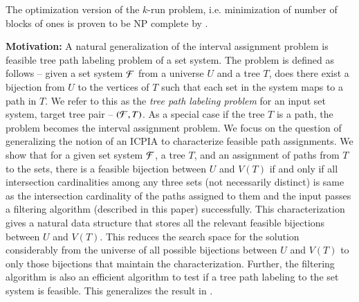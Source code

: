 \documentclass[MS,]{iitmdiss}
\begin{document}
The optimization version of the $k$-run problem, i.e. minimization of
number of blocks of ones is proven to be NP complete by
\cite{k77}. 




{\bf Motivation: } A natural generalization of the interval assignment problem is
feasible tree path labeling problem of a set system. The problem is
defined as follows -- given a set system ${\cal F}$ from a universe $U$ and
a tree $T$, does there exist a bijection from $U$ to the vertices of
$T$ such that each set in the system maps to a path in $T$.  We refer
to this as the {\em tree path labeling problem} for an input set
system, target tree pair -- $({\cal F},T)$. As a special case if the tree
$T$ is a path, the problem becomes the interval assignment problem.
We focus on the question of generalizing the notion of an ICPIA
\cite{nsnrs09} to characterize feasible path assignments.  We show
that for a given set system ${\cal F}$, a tree $T$, and an assignment of
paths from $T$ to the sets, there is a feasible bijection between $U$
and $V(T)$ if and only if all intersection cardinalities among any
three sets (not necessarily distinct) is same as the intersection
cardinality of the paths assigned to them and the input passes a
filtering algorithm (described in this paper) successfully.  This
characterization gives a natural data structure that stores all the
relevant feasible bijections between $U$ and $V(T)$. This reduces the
search space for the solution considerably from the universe of all
possible bijections between $U$ and $V(T)$ to only those bijections
that maintain the characterization.  Further, the
filtering algorithm is also an efficient algorithm to test if a tree
path labeling to the set system is feasible.  This generalizes the
result in \cite{nsnrs09}.
\end{document}
